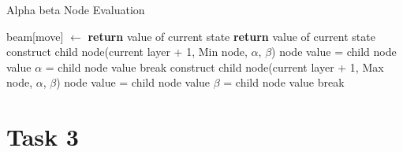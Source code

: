 \documentclass[a4paper,12pt]{article}
\begin{document}
\begin{algorithm}[H]
\caption{Alpha beta Node Evaluation}
\begin{algorithmic}
\Statex
\State beam[move] $\gets$ 
\Statex
{}
    \State \textbf{return} value of current state
\Statex
{}
    \State \textbf{return} value of current state
\Statex
{}
        \State construct child node(current layer + 1, Min node, $\alpha$, $\beta$)
            \State node value = child node value
            \State $\alpha$ = child node value
            \If{$\alpha \geq \beta$}
                \State break
            \EndIf
        \EndIf
    \EndFor
\Statex
{}
        \State construct child node(current layer + 1, Max node, $\alpha$, $\beta$)
            \State node value = child node value
            \State $\beta$ = child node value
            \If{$\alpha \geq \beta$}
                \State break
            \EndIf
        \EndIf
    \EndFor
\EndIf
\EndFunction
\end{algorithmic}
\end{algorithm}

\section{Task 3}
\end{document}
